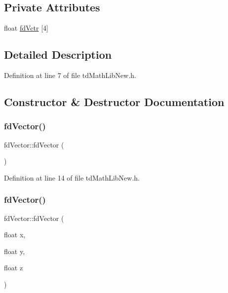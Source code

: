 \subsection*{Private Attributes}
\begin{DoxyCompactItemize}
\item 
float \hyperlink{classfd_vector_a308672d043f9518b2c607e8b839ed476}{fd\+Vctr} \mbox{[}4\mbox{]}
\end{DoxyCompactItemize}


\subsection{Detailed Description}


Definition at line 7 of file td\+Math\+Lib\+New.\+h.



\subsection{Constructor \& Destructor Documentation}
\hypertarget{classfd_vector_ae193285f8bf5e0243f4cbdaca41f8e07}{}\label{classfd_vector_ae193285f8bf5e0243f4cbdaca41f8e07} 
\subsubsection{\texorpdfstring{fd\+Vector()}{fdVector()}\hspace{0.1cm}{\footnotesize\ttfamily [1/4]}}
{\footnotesize\ttfamily fd\+Vector\+::fd\+Vector (\begin{DoxyParamCaption}{ }\end{DoxyParamCaption})\hspace{0.3cm}{\ttfamily [inline]}}



Definition at line 14 of file td\+Math\+Lib\+New.\+h.

\hypertarget{classfd_vector_a1223fe25ab0e876d0bedf51a4c8d4ede}{}\label{classfd_vector_a1223fe25ab0e876d0bedf51a4c8d4ede} 
\subsubsection{\texorpdfstring{fd\+Vector()}{fdVector()}\hspace{0.1cm}{\footnotesize\ttfamily [2/4]}}
{\footnotesize\ttfamily fd\+Vector\+::fd\+Vector (\begin{DoxyParamCaption}\item[{float}]{x,  }\item[{float}]{y,  }\item[{float}]{z }\end{DoxyParamCaption})\hspace{0.3cm}{\ttfamily [inline]}}



